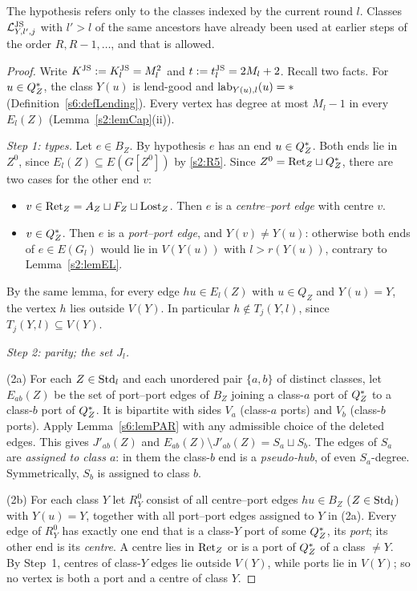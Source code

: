 The hypothesis refers only to the classes indexed by the current round $l$. Classes $\mathcal{L}^{\mathrm{JS}}_{Y,l',j}$ with $l'>l$ of the same ancestors have already been used at earlier steps of the order $R,R-1,\dots$, and that is allowed.

\begin{proof}
Write $K^{\mathrm{JS}}:=K^{\mathrm{JS}}_l=M_l^2$ and $t:=t^{\mathrm{JS}}_l=2M_l+2$. Recall two facts. For $u\in Q^{*}_Z$, the class $Y(u)$ is lend-good and $\mathrm{lab}_{Y(u),l}(u)=*$ (Definition~\ref{s6:defLending}). Every vertex has degree at most $M_l-1$ in every $E_l(Z)$ (Lemma~\ref{s2:lemCap}(ii)).

\emph{Step 1: types.} Let $e\in B_Z$. By hypothesis $e$ has an end $u\in Q^{*}_Z$. Both ends lie in $Z^0$, since $E_l(Z)\subseteq E(G[Z^0])$ by \ref{s2:R5}. Since $Z^0=\mathrm{Ret}_Z\sqcup Q^{*}_Z$, there are two cases for the other end $v$:
\begin{itemize}
\item $v\in\mathrm{Ret}_Z=A_Z\sqcup F_Z\sqcup\mathrm{Lost}_Z$. Then $e$ is a \emph{centre--port edge} with centre $v$.
\item $v\in Q^{*}_Z$. Then $e$ is a \emph{port--port edge}, and $Y(v)\neq Y(u)$: otherwise both ends of $e\in E(G_l)$ would lie in $V(Y(u))$ with $l>r(Y(u))$, contrary to Lemma~\ref{s2:lemEL}.
\end{itemize}
By the same lemma, for every edge $hu\in E_l(Z)$ with $u\in Q_Z$ and $Y(u)=Y$, the vertex $h$ lies outside $V(Y)$. In particular $h\notin T_j(Y,l)$, since $T_j(Y,l)\subseteq V(Y)$.

\emph{Step 2: parity; the set $J_l$.}

(2a) For each $Z\in\mathrm{Std}_l$ and each unordered pair $\{a,b\}$ of distinct classes, let $E_{ab}(Z)$ be the set of port--port edges of $B_Z$ joining a class-$a$ port of $Q^{*}_Z$ to a class-$b$ port of $Q^{*}_Z$. It is bipartite with sides $V_a$ (class-$a$ ports) and $V_b$ (class-$b$ ports). Apply Lemma~\ref{s6:lemPAR} with any admissible choice of the deleted edges. This gives $J'_{ab}(Z)$ and $E_{ab}(Z)\setminus J'_{ab}(Z)=S_a\sqcup S_b$. The edges of $S_a$ are \emph{assigned to class $a$}: in them the class-$b$ end is a \emph{pseudo-hub}, of even $S_a$-degree. Symmetrically, $S_b$ is assigned to class $b$.

(2b) For each class $Y$ let $R^0_Y$ consist of all centre--port edges $hu\in B_Z$ ($Z\in\mathrm{Std}_l$) with $Y(u)=Y$, together with all port--port edges assigned to $Y$ in (2a). Every edge of $R^0_Y$ has exactly one end that is a class-$Y$ port of some $Q^{*}_Z$, its \emph{port}; its other end is its \emph{centre}. A centre lies in $\mathrm{Ret}_Z$ or is a port of $Q^{*}_Z$ of a class $\neq Y$. By Step~1, centres of class-$Y$ edges lie outside $V(Y)$, while ports lie in $V(Y)$; so no vertex is both a port and a centre of class $Y$.


\end{proof}
